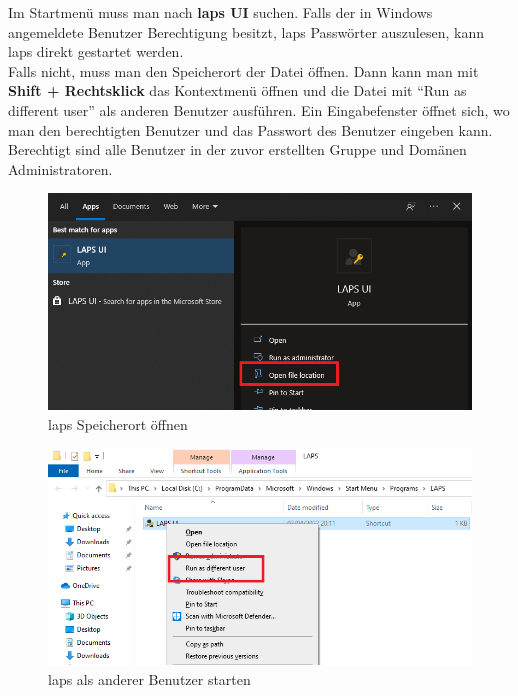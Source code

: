Im Startmenü muss man nach \textbf{\acrshort{laps} UI} suchen. Falls der in Windows angemeldete Benutzer Berechtigung besitzt, \acrshort{laps} Passwörter auszulesen, kann \acrshort{laps} direkt gestartet werden.\\
Falls nicht, muss man den Speicherort der Datei öffnen.
Dann kann man mit \textbf{Shift + Rechtsklick} das Kontextmenü öffnen und die Datei mit ``Run as different user'' als anderen Benutzer ausführen.
Ein Eingabefenster öffnet sich, wo man den berechtigten Benutzer und das Passwort des Benutzer eingeben kann.
Berechtigt sind alle Benutzer in der zuvor erstellten Gruppe und Domänen Administratoren.\\
\begin{minipage}{0.5\linewidth}
    \begin{figure}[H]
        \centering
        \includegraphics[width=\linewidth]{../img/LAPS/usage-1.png}
        \caption{\acrshort{laps} Speicherort öffnen}
    \end{figure}
\end{minipage}
\begin{minipage}{0.5\linewidth}
    \begin{figure}[H]
        \centering
        \includegraphics[width=\linewidth]{../img/LAPS/usage-2.png}
        \caption{\acrshort{laps} als anderer Benutzer starten}
    \end{figure}
\end{minipage}\\

